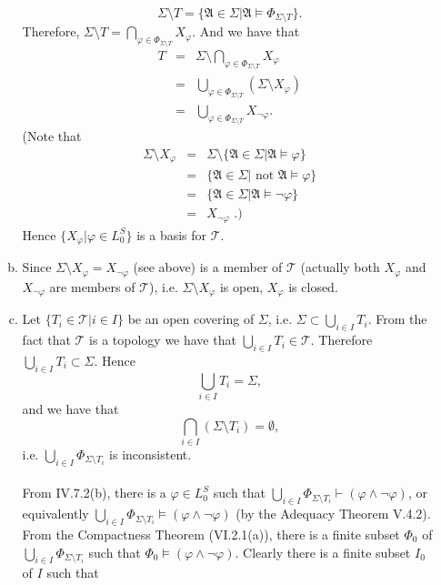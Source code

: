 \begin{enumerate}[1.]
\begin{enumerate}[(a)]
\[
\Sigma \setminus T = \{ \mathfrak{A} \in \Sigma | \mathfrak{A} \models \Phi_{\Sigma \setminus T} \}.
\]
Therefore, $\Sigma \setminus T = \bigcap_{\varphi \in \Phi_{\Sigma \setminus T}} X_\varphi$. And we have that
\[
\begin{array}{lll}
T & = & \Sigma \setminus \bigcap_{\varphi \in \Phi_{\Sigma \setminus T}} X_\varphi \\
\ & = & \bigcup_{\varphi \in \Phi_{\Sigma \setminus T}} (\Sigma \setminus X_\varphi) \\
\ & = & \bigcup_{\varphi \in \Phi_{\Sigma \setminus T}} X_{\neg \varphi} .
\end{array}
\]
(Note that
\[
\begin{array}{lll}
\Sigma \setminus X_\varphi & = & \Sigma \setminus \{\mathfrak{A} \in \Sigma | \mathfrak{A} \models \varphi \} \\
\ & = & \{\mathfrak{A} \in \Sigma | \mbox{ not $\mathfrak{A} \models \varphi$}\} \\
\ & = & \{\mathfrak{A} \in \Sigma | \mathfrak{A} \models \neg \varphi \} \\
\ & = & X_{\neg \varphi} \mbox{\ \ .)}
\end{array}
\]
Hence $\{ X_\varphi | \varphi \in L_0^S \}$ is a basis for $\mathcal{T}$.
\item Since $\Sigma \setminus X_\varphi = X_{\neg \varphi}$ (see above) is a member of $\mathcal{T}$ (actually both $X_\varphi$ and $X_{\neg \varphi}$ are members of $\mathcal{T}$), i.e. $\Sigma \setminus X_\varphi$ is open, $X_\varphi$ is closed.
\item Let $\{T_i \in \mathcal{T} | i \in I \}$ be an open covering of $\Sigma$, i.e. $\Sigma \subset \bigcup_{i \in I} T_i$. From the fact that $\mathcal{T}$ is a topology we have that $\bigcup_{i \in I} T_i \in \mathcal{T}$. Therefore $\bigcup_{i \in I} T_i \subset \Sigma$. Hence
\[
\bigcup_{i \in I} T_i = \Sigma,
\]
and we have that
\[
\bigcap_{i \in I} (\Sigma \setminus T_i) = \emptyset,
\]
i.e. $\bigcup_{i \in I} \Phi_{\Sigma \setminus T_i}$ is inconsistent.\\
\\
From IV.7.2(b), there is a $\varphi \in L_0^S$ such that $\bigcup_{i \in I} \Phi_{\Sigma \setminus T_i} \vdash (\varphi \land \neg \varphi)$, or equivalently $\bigcup_{i \in I} \Phi_{\Sigma \setminus T_i} \models (\varphi \land \neg \varphi)$ (by the Adequacy Theorem V.4.2). From the Compactness Theorem (VI.2.1(a)), there is a finite subset $\Phi_0$ of $\bigcup_{i \in I} \Phi_{\Sigma \setminus T_i}$ such that $\Phi_0 \models (\varphi \land \neg \varphi)$. Clearly there is a finite subset $I_0$ of $I$ such that

\end{enumerate}
\end{enumerate}
